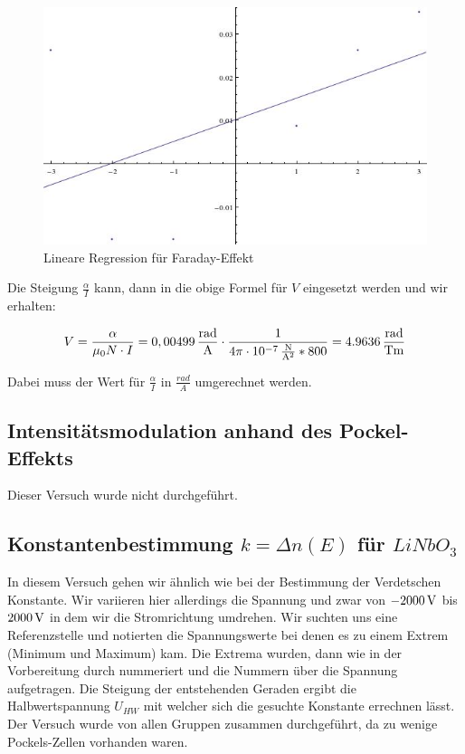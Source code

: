 \documentclass[a4paper,titlepage]{scrartcl}
\numberwithin{equation}{section}
\begin{document}
\begin{figure}[H]
\centering
\includegraphics[scale=.3]{bilder/aufgabe32.jpg} 
\caption{Lineare Regression für Faraday-Effekt}
\end{figure}

Die Steigung $\frac{\alpha}{I}$ kann, dann in die obige Formel für $V$ eingesetzt werden und wir erhalten:

\begin{equation*}
V = \frac{\alpha}{\mu_0 N \cdot I} = \unit[0,00499]{\frac{rad}{A}} \cdot \frac{1}{4\pi \cdot \unit[10 ^{-7}]{\frac{N}{A^2}}*800}= \unit[4.9636]{\frac{rad}{Tm}}
\end{equation*}

Dabei muss der Wert für $\frac{\alpha}{I}$ in $\frac{rad}{A}$ umgerechnet werden.
\subsection{Intensitätsmodulation anhand des Pockel-Effekts}
Dieser Versuch wurde nicht durchgeführt.
\subsection{Konstantenbestimmung $k=\Delta n(E)$ für $LiNbO_3$}
In diesem Versuch gehen wir ähnlich wie bei der Bestimmung der Verdetschen Konstante. Wir variieren hier allerdings die Spannung und zwar von $\unit[-2000]{V}$ bis $\unit[2000]{V}$ in dem wir die Stromrichtung umdrehen. Wir suchten uns eine Referenzstelle und notierten die Spannungswerte bei denen es zu einem Extrem (Minimum und Maximum) kam. Die Extrema wurden, dann wie in der Vorbereitung durch nummeriert und die Nummern über die Spannung aufgetragen. Die Steigung der entstehenden Geraden ergibt die Halbwertspannung $U_{HW}$ mit welcher sich die gesuchte Konstante errechnen lässt.\\
Der Versuch wurde von allen Gruppen zusammen durchgeführt, da zu wenige Pockels-Zellen vorhanden waren.
\end{document}
